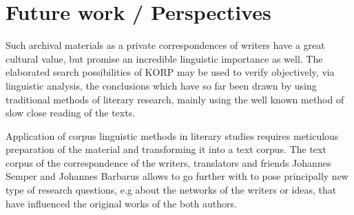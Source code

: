 \documentclass[runningheads]{llncs}
\begin{document}
\section{Future work / Perspectives}

Such archival materials as a private correspondences of writers have a great cultural value, but promise an incredible linguistic importance as well. The elaborated search possibilities of KORP may be used to verify objectively, via linguistic analysis, the conclusions which have so far been drawn by using traditional methods of literary research, mainly using the well known method of slow close reading of the texts. 

Application of corpus linguistic methods in literary studies requires meticulous preparation of the material and transforming it into a text corpus. The text corpus of the correspondence of the writers, translators and friends Johannes Semper and Johannes Barbarus allows to go further with to pose principally new type of research  questions, e.g about the networks of the writers or ideas, that have influenced  the original works of the both authors.





%
%
%


%
\end{document}
